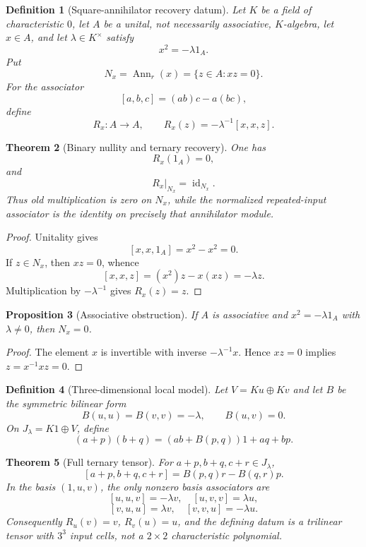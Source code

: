 \documentclass[11pt]{article}
\newtheorem{definition}{Definition}
\newtheorem{theorem}[definition]{Theorem}
\newtheorem{proposition}[definition]{Proposition}
\newcommand{\Ann}{\operatorname{Ann}}
\newcommand{\id}{\operatorname{id}}
\begin{document}
\begin{definition}[Square-annihilator recovery datum]
Let $K$ be a field of characteristic $0$, let $A$ be a unital, not necessarily associative, $K$-algebra, let $x\in A$, and let $\lambda\in K^\times$ satisfy
\[
x^2=-\lambda1_A.
\]
Put
\[
N_x=\Ann_r(x)=\{z\in A:xz=0\}.
\]
For the associator
\[
[a,b,c]=(ab)c-a(bc),
\]
define
\[
R_x:A\to A,\qquad R_x(z)=-\lambda^{-1}[x,x,z].
\]
\end{definition}

\begin{theorem}[Binary nullity and ternary recovery]
One has
\[
R_x(1_A)=0,
\]
and
\[
R_x|_{N_x}=\id_{N_x}.
\]
Thus old multiplication is zero on $N_x$, while the normalized repeated-input associator is the identity on precisely that annihilator module.
\end{theorem}

\begin{proof}
Unitality gives
\[
[x,x,1_A]=x^2-x^2=0.
\]
If $z\in N_x$, then $xz=0$, whence
\[
[x,x,z]=(x^2)z-x(xz)=-\lambda z.
\]
Multiplication by $-\lambda^{-1}$ gives $R_x(z)=z$.
\end{proof}

\begin{proposition}[Associative obstruction]
If $A$ is associative and $x^2=-\lambda1_A$ with $\lambda\ne0$, then $N_x=0$.
\end{proposition}

\begin{proof}
The element $x$ is invertible with inverse $-\lambda^{-1}x$.  Hence $xz=0$ implies $z=x^{-1}xz=0$.
\end{proof}

\begin{definition}[Three-dimensional local model]
Let $V=Ku\oplus Kv$ and let $B$ be the symmetric bilinear form
\[
B(u,u)=B(v,v)=-\lambda,\qquad B(u,v)=0.
\]
On $J_\lambda=K1\oplus V$, define
\[
(a+p)(b+q)=(ab+B(p,q))1+aq+bp.
\]
\end{definition}

\begin{theorem}[Full ternary tensor]
For $a+p,b+q,c+r\in J_\lambda$,
\[
[a+p,b+q,c+r]=B(p,q)r-B(q,r)p.
\]
In the basis $(1,u,v)$, the only nonzero basis associators are
\[
[u,u,v]=-\lambda v,\quad [u,v,v]=\lambda u,
\]
\[
[v,u,u]=\lambda v,\quad [v,v,u]=-\lambda u.
\]
Consequently $R_u(v)=v$, $R_v(u)=u$, and the defining datum is a trilinear tensor with $3^3$ input cells, not a $2\times2$ characteristic polynomial.
\end{theorem}
\end{document}
